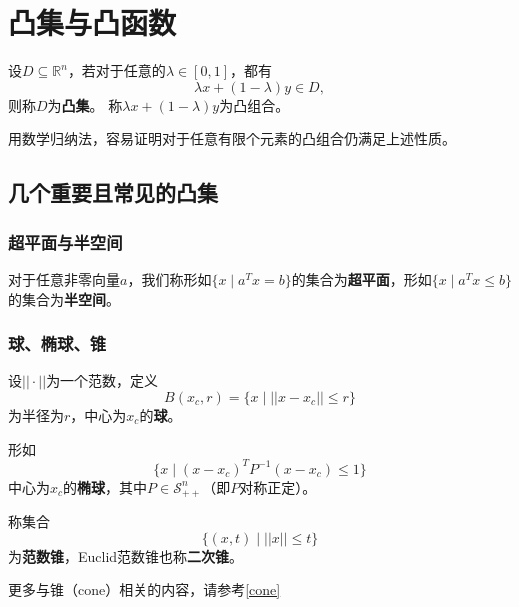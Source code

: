 \section{凸集与凸函数}
\begin{definition}
	设$D\subseteq \mathbb{R}^n$，若对于任意的$\lambda\in [0, 1]$，都有
	\begin{equation*}
		\lambda x + (1-\lambda )y \in D,
	\end{equation*}
	则称$D$为\textbf{凸集}。
	称$\lambda x + (1-\lambda )y$为凸组合。
\end{definition}
\begin{note}
	用数学归纳法，容易证明对于任意有限个元素的凸组合仍满足上述性质。
\end{note}
\subsection{几个重要且常见的凸集}
\subsubsection{超平面与半空间}
对于任意非零向量$a$，我们称形如$\{x\mid a^Tx = b\}$的集合为\textbf{超平面}，形如$\{x\mid a^Tx \leq b\}$的集合为\textbf{半空间}。
\subsubsection{球、椭球、锥}
\begin{definition}
	设$||\cdot||$为一个范数，定义
	\begin{equation*}
		B(x_c, r) = \{x\mid ||x-x_c||\leq r\}
	\end{equation*}
	为半径为$r$，中心为$x_c$的\textbf{球}。
\end{definition}
\begin{definition}
	形如
	\begin{equation*}
		\{x\mid (x-x_c)^TP^{-1}(x-x_c)\leq 1\}
	\end{equation*}
	中心为$x_c$的\textbf{椭球}，其中$P\in\mathcal{S}_{++}^n$（即$P$对称正定）。
\end{definition}
\begin{definition}
	称集合
	\begin{equation*}
		\{(x, t)\mid ||x||\leq t\}
	\end{equation*}
	为\textbf{范数锥}，Euclid范数锥也称\textbf{二次锥}。
\end{definition}
更多与锥（cone）相关的内容，请参考\ref{cone}

